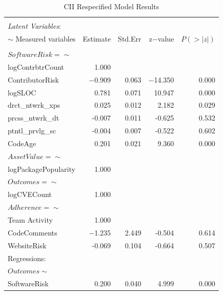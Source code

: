 \begin{table}
	\begin{center}	
		\caption{CII Respecified Model Results}
		\label{tab:results_cii}
		\begin{tabular}{l|rrrr}
			\\[-1.8ex]\hline 
			\hline \\[-1.8ex] 
			\textit{Latent Variables}:  & & & & \\  
			$\sim$ Measured variables& Estimate & Std.Err & z$-$value & $P(>|z|)$ \\
			\hline \\[-1.8ex]
			$SoftwareRisk =\sim$  & & & & \\  
		    logContrbtrCount  &  1.000   & &  &   \\           
		    ContributorRisk  &  $-$0.909  &  0.063 & $-$14.350 &   0.000\\		
		    logSLOC        &   0.781  &  0.071  & 10.947  &  0.000\\
		    drct\_ntwrk\_xps &   0.025  &  0.012  &  2.182  &  0.029\\
		    prcss\_ntwrk\_dt &  -0.007  &  0.011  & -0.625  &  0.532\\
		    ptntl\_prvlg\_sc &  -0.004  &  0.007  & -0.522  &  0.602\\
		    CodeAge        &   0.201  &  0.021  &  9.360  &  0.000\\	
			$AssetValue =\sim$     & & & & \\                                    
			logPackagePopularity   & 1.000     & & & \\                       
			$Outcomes =\sim$    & & & & \\                                     
			logCVECount     &  1.000  & & & \\                          
			$Adherence =\sim$   & & & & \\                                      
			Team Activity    &     1.000        & & & \\      
			CodeComments  &   $-$1.235 &   2.449 &  -0.504 &   0.614\\
			WebsiteRisk   &   -0.069  &  0.104  & -0.664 &   0.507\\              
			Regressions:  & & & & \\  
			$Outcomes \sim$         & & & & \\                                     
			SoftwareRisk   &  0.200 &   0.040 & 4.999 &   0.000 \\

\end{tabular}
\end{center}
\end{table}
